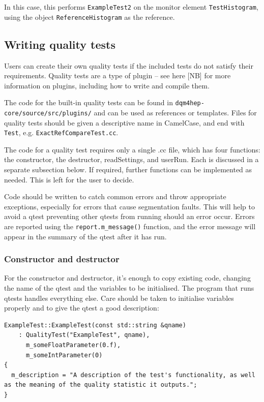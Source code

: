 In this case, this performs \texttt{ExampleTest2} on the monitor element \texttt{TestHistogram}, using the object \texttt{ReferenceHistogram} as the reference. 

\subsection{Writing quality tests}
Users can create their own quality tests if the included tests do not satisfy their requirements. Quality tests are a type of plugin – see here [NB] for more information on plugins, including how to write and compile them.

The code for the built-in quality tests can be found in \texttt{dqm4hep-core/source/src/plugins/} and can be used as references or templates. Files for quality tests should be given a descriptive name in CamelCase, and end with \texttt{Test}, e.g. \texttt{ExactRefCompareTest.cc}.

The code for a quality test requires only a single .cc file, which has four functions: the constructor, the destructor, readSettings, and userRun. Each is discussed in a separate subsection below. If required, further functions can be implemented as needed. This is left for the user to decide.

Code should be written to catch common errors and throw appropriate exceptions, especially for errors that cause segmentation faults. This will help to avoid a qtest preventing other qtests from running should an error occur. Errors are reported using the \texttt{report.m\_message()} function, and the error message will appear in the summary of the qtest after it has run.

\subsubsection{Constructor and destructor}
For the constructor and destructor, it's enough to copy existing code, changing the name of the qtest and the variables to be initialised. The program that runs qtests handles everything else. Care should be taken to initialise variables properly and to give the qtest a good description:

\begin{verbatim}
ExampleTest::ExampleTest(const std::string &qname)
    : QualityTest("ExampleTest", qname),
      m_someFloatParameter(0.f),
      m_someIntParameter(0)
{
  m_description = "A description of the test's functionality, as well as the meaning of the quality statistic it outputs.";
}
\end{verbatim}

